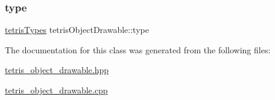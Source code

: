 \mbox{\label{classtetrisObjectDrawable_a0166b001667649c81bc968b4094ee557}} 
\subsubsection{\texorpdfstring{type}{type}}
{\footnotesize\ttfamily \hyperlink{enums_8hpp_aa2b983d3f5fee7f17796e5ef5040d787}{tetris\+Types} tetris\+Object\+Drawable\+::type\hspace{0.3cm}{\ttfamily [protected]}}



The documentation for this class was generated from the following files\+:\begin{DoxyCompactItemize}
\item 
\hyperlink{tetris__object__drawable_8hpp}{tetris\+\_\+object\+\_\+drawable.\+hpp}\item 
\hyperlink{tetris__object__drawable_8cpp}{tetris\+\_\+object\+\_\+drawable.\+cpp}\end{DoxyCompactItemize}
